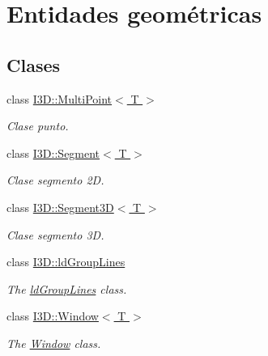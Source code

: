 \hypertarget{group___geometric_entities}{}\section{Entidades geométricas}
\label{group___geometric_entities}
\subsection*{Clases}
\begin{DoxyCompactItemize}
\item 
class \hyperlink{class_i3_d_1_1_multi_point}{I3\+D\+::\+Multi\+Point$<$ T $>$}
\begin{DoxyCompactList}\small\item\em Clase punto. \end{DoxyCompactList}\item 
class \hyperlink{class_i3_d_1_1_segment}{I3\+D\+::\+Segment$<$ T $>$}
\begin{DoxyCompactList}\small\item\em Clase segmento 2D. \end{DoxyCompactList}\item 
class \hyperlink{class_i3_d_1_1_segment3_d}{I3\+D\+::\+Segment3\+D$<$ T $>$}
\begin{DoxyCompactList}\small\item\em Clase segmento 3D. \end{DoxyCompactList}\item 
class \hyperlink{class_i3_d_1_1ld_group_lines}{I3\+D\+::ld\+Group\+Lines}
\begin{DoxyCompactList}\small\item\em The \hyperlink{class_i3_d_1_1ld_group_lines}{ld\+Group\+Lines} class. \end{DoxyCompactList}\item 
class \hyperlink{class_i3_d_1_1_window}{I3\+D\+::\+Window$<$ T $>$}
\begin{DoxyCompactList}\small\item\em The \hyperlink{class_i3_d_1_1_window}{Window} class. \end{DoxyCompactList}\end{DoxyCompactItemize}
